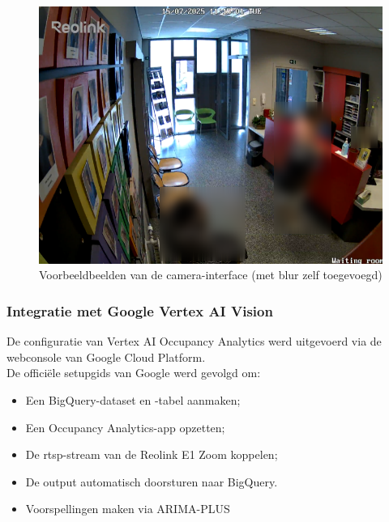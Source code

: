 \begin{figure}[h!]
    \vspace{0.5em} %
    
    \begin{minipage}[b]{0.5\textwidth}
        \centering
        \includegraphics[width=\textwidth]{img/bp/vertex/camera_image_waitingroom_blurred.png}
    \end{minipage}
    
    \caption{Voorbeeldbeelden van de camera-interface (met blur zelf toegevoegd)}
    \label{fig:wgc-vertex-camera}
\end{figure}


\subsubsection{Integratie met Google Vertex AI Vision}
De configuratie van Vertex AI Occupancy Analytics werd uitgevoerd via de webconsole van Google Cloud Platform. \\

De officiële setupgids van Google \autocite{Cloud} werd gevolgd om:
\begin{itemize}
    \item Een BigQuery-dataset en -tabel aanmaken;
    \item Een Occupancy Analytics-app opzetten;
    \item De \gls{rtsp}-stream van de Reolink E1 Zoom koppelen;
    \item De output automatisch doorsturen naar BigQuery.
    \item Voorspellingen maken via ARIMA-PLUS
\end{itemize}

